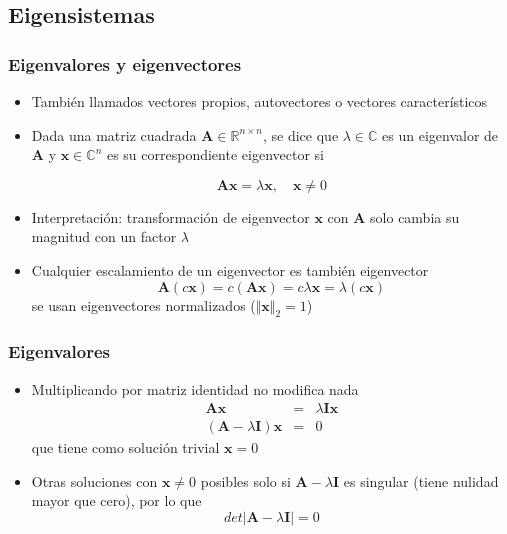 \documentclass{beamer}
\begin{document}
\subsection{Eigensistemas}
\begin{frame}
\frametitle{Eigenvalores y eigenvectores}

\begin{itemize}
\item También llamados vectores propios, autovectores o vectores característicos
\item Dada una matriz cuadrada $\boldsymbol{A} \in \mathbb{R}^{n \times n}$, se dice que $ \lambda \in \mathbb{C}$ es un eigenvalor de $\boldsymbol{A}$ y $ \boldsymbol{x} \in  \mathbb{C}^n$ es su correspondiente eigenvector si 

\begin{equation*}
\boldsymbol{A}\boldsymbol{x}= \lambda\boldsymbol{x}, \quad \boldsymbol{x} \neq 0
\end{equation*}

\item Interpretación: transformación de eigenvector $\boldsymbol{x}$ con $\boldsymbol{A}$ solo cambia su magnitud con un factor $\lambda$
\item Cualquier escalamiento de un eigenvector es también eigenvector
\begin{equation*}
\boldsymbol{A}(c \boldsymbol{x})= c(\boldsymbol{A}\boldsymbol{x})= c\lambda \boldsymbol{x}=  \lambda(c \boldsymbol{x})
\end{equation*}
se usan eigenvectores normalizados ($\Vert \boldsymbol{x} \Vert_{2}=1$)
\end{itemize}
\end{frame}
\begin{frame}
\frametitle{Eigenvalores}
\begin{itemize}
\item Multiplicando por matriz identidad no modifica nada
\begin{equation*}
\begin{array}{rcl}
\boldsymbol{A}\boldsymbol{x}&=& \lambda  \boldsymbol{I}\boldsymbol{x}\\
 (\boldsymbol{A}- \lambda \boldsymbol{I}) \boldsymbol{x}&=&0
\end{array}
\end{equation*}
que tiene como solución trivial $\boldsymbol{x}=0$
\item Otras soluciones con $\boldsymbol{x}\neq 0$ posibles solo si $ \boldsymbol{A}- \lambda \boldsymbol{I}$ es singular (tiene nulidad mayor que cero), por lo que 
\begin{equation*}
det \vert \boldsymbol{A}- \lambda \boldsymbol{I}\vert = 0
\end{equation*}
\end{itemize}

\end{frame}
\end{document}
